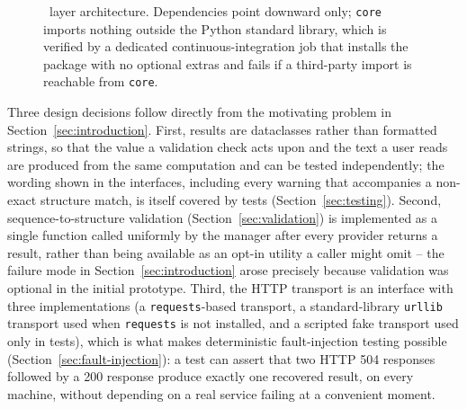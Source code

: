 \begin{figure}[htbp]
\centering
{}
\caption{\bsi\ layer architecture. Dependencies point downward only;
\texttt{core} imports nothing outside the Python standard library, which is
verified by a dedicated continuous-integration job that installs the package
with no optional extras and fails if a third-party import is reachable from
\texttt{core}.}
\label{fig:architecture}
\end{figure}

Three design decisions follow directly from the motivating problem in
Section~\ref{sec:introduction}. First, results are dataclasses rather than
formatted strings, so that the value a validation check acts upon and the
text a user reads are produced from the same computation and can be tested
independently; the wording shown in the interfaces, including every warning
that accompanies a non-exact structure match, is itself covered by tests
(Section~\ref{sec:testing}). Second, sequence-to-structure validation
(Section~\ref{sec:validation}) is implemented as a single function called
uniformly by the manager after every provider returns a result, rather than
being available as an opt-in utility a caller might omit -- the failure mode
in Section~\ref{sec:introduction} arose precisely because validation was
optional in the initial prototype. Third, the HTTP transport is an
interface with three implementations (a \texttt{requests}-based transport,
a standard-library \texttt{urllib} transport used when \texttt{requests} is
not installed, and a scripted fake transport used only in tests), which is
what makes deterministic fault-injection testing possible
(Section~\ref{sec:fault-injection}): a test can assert that two HTTP 504
responses followed by a 200 response produce exactly one recovered result,
on every machine, without depending on a real service failing at a
convenient moment.

